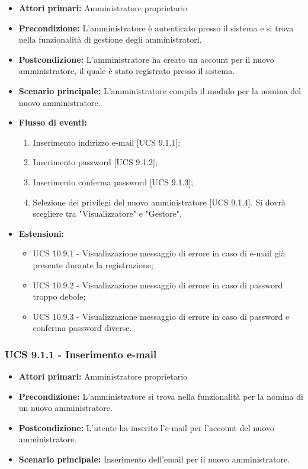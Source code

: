 \begin{itemize}
\item \textbf{Attori primari:} Amministratore proprietario
\item \textbf{Precondizione:} L'amministratore è autenticato presso il sistema e si trova nella funzionalità di gestione degli amministratori.
\item \textbf{Postcondizione:} L'amministratore ha creato un account per il nuovo amministratore, il quale è stato registrato presso il sistema.
\item \textbf{Scenario principale:} L'amministratore compila il modulo per la nomina del nuovo amministratore.
\item \textbf{Flusso di eventi:} %
  \begin{enumerate}
        \item Inserimento indirizzo e-mail [UCS 9.1.1];
        \item Inserimento password [UCS 9.1.2];
        \item Inserimento conferma password [UCS 9.1.3];
        \item Selezione dei privilegi del nuovo amministratore [UCS 9.1.4]. Si dovrà scegliere tra "Visualizzatore" e "Gestore".
    \end{enumerate}
\item \textbf{Estensioni:}
	\begin{itemize}
		\item UCS 10.9.1 - Visualizzazione messaggio di errore in caso di e-mail già presente durante la registrazione;
		\item UCS 10.9.2 - Visualizzazione messaggio di errore in caso di password troppo debole;
		\item UCS 10.9.3 - Visualizzazione messaggio di errore in caso di password e conferma password diverse.
	\end{itemize}
\end{itemize}

\subsubsection{UCS 9.1.1 - Inserimento e-mail}
\begin{itemize}
\item \textbf{Attori primari:} Amministratore proprietario
\item \textbf{Precondizione:} L'amministratore si trova nella funzionalità per la nomina di un nuovo amministratore.
\item \textbf{Postcondizione:} L'utente ha inserito l'e-mail per l'account del nuovo amministratore.
\item \textbf{Scenario principale:} Inserimento dell'email per il nuovo amministratore.
\end{itemize}

